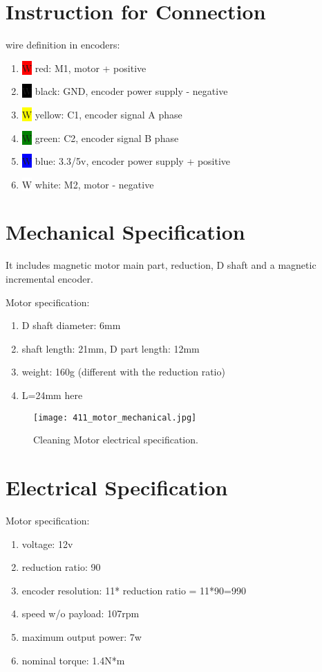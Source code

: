 \section{Instruction for Connection}
wire definition in encoders:
\begin{enumerate}
	\item {\colorbox{red}W red}: M1, motor + positive
	\item {\colorbox{black}W black}: GND, encoder power supply - negative
	\item {\colorbox{yellow}W yellow}: C1, encoder signal A phase
	\item {\colorbox{green}W green}: C2, encoder signal B phase
	\item {\colorbox{blue}W blue}: 3.3/5v, encoder power supply + positive
	\item {\colorbox{white}W white}: M2, motor - negative 
\end{enumerate}

\section{Mechanical Specification}
It includes magnetic motor main part, reduction,  D shaft and a magnetic incremental encoder.

Motor specification:
\begin{enumerate}
	\item D shaft diameter: 6mm
	\item shaft length: 21mm, D part length: 12mm
	\item weight: 160g (different with the reduction ratio)
	\item L=24mm here
\end{enumerate}

\begin{figure}[htb]
	\texttt{[image: 411\_motor\_mechanical.jpg]}
	\caption[Cleaning Motor mechanical specification]{ 
		Cleaning Motor electrical specification.		 
		}
\end{figure}

\section{Electrical Specification}
Motor specification:
\begin{enumerate}
	\item voltage: 12v
	\item reduction ratio: 90 
	\item encoder resolution: 11* reduction ratio = 11*90=990
	\item speed w/o payload: 107rpm
	\item maximum output power: 7w
	\item nominal torque: 1.4N*m
\end{enumerate}

